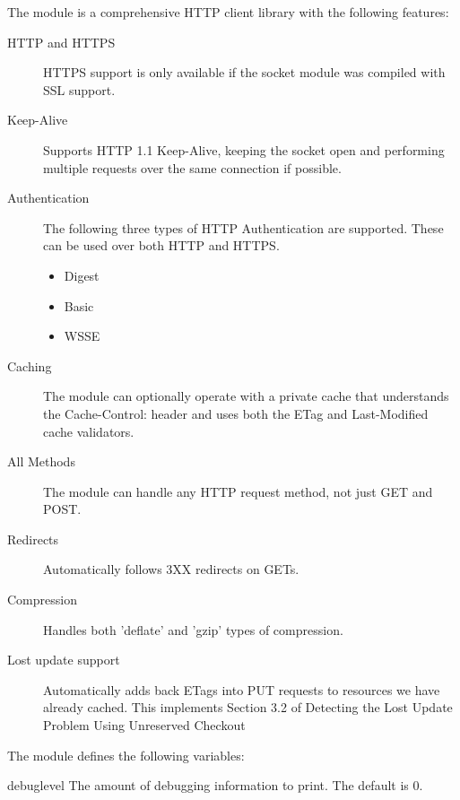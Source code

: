 The  module is a comprehensive HTTP client library with the following features:

\begin{description}
\item[HTTP and HTTPS]  HTTPS support is only available if the socket module was compiled with SSL support. 
\item[Keep-Alive]    Supports HTTP 1.1 Keep-Alive, keeping the socket open and performing multiple requests over the same connection if possible. 
\item[Authentication] The following three types of HTTP Authentication are supported. These can be used over both HTTP and HTTPS.
    \begin{itemize}
        \item Digest
        \item Basic
        \item WSSE
    \end{itemize}
\item[Caching]
    The module can optionally operate with a private cache that understands the Cache-Control: header and uses both the ETag and Last-Modified cache validators. 
\item[All Methods]
    The module can handle any HTTP request method, not just GET and POST.
\item[Redirects]
    Automatically follows 3XX redirects on GETs.
\item[Compression]
    Handles both 'deflate' and 'gzip' types of compression.
\item[Lost update support]
    Automatically adds back ETags into PUT requests to resources we have already cached. This implements Section 3.2 of Detecting the Lost Update Problem Using Unreserved Checkout
\end{description}


The  module defines the following variables:

\begin{datadesc}{debuglevel}
The amount of debugging information to print. The default is 0.
\end{datadesc}

